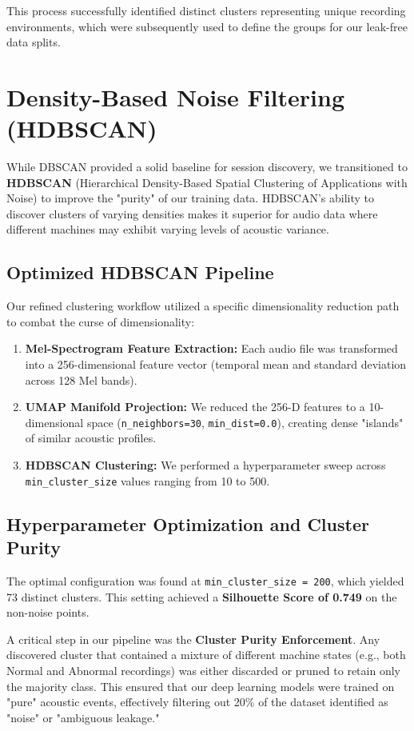 This process successfully identified distinct clusters representing unique recording environments, which were subsequently used to define the groups for our leak-free data splits.

\section{Density-Based Noise Filtering (HDBSCAN)}
While DBSCAN provided a solid baseline for session discovery, we transitioned to \textbf{HDBSCAN} (Hierarchical Density-Based Spatial Clustering of Applications with Noise) \cite{hdbscan2013} to improve the "purity" of our training data. HDBSCAN's ability to discover clusters of varying densities makes it superior for audio data where different machines may exhibit varying levels of acoustic variance.

\subsection{Optimized HDBSCAN Pipeline}
Our refined clustering workflow utilized a specific dimensionality reduction path to combat the curse of dimensionality:
\begin{enumerate}
    \item \textbf{Mel-Spectrogram Feature Extraction:} Each audio file was transformed into a 256-dimensional feature vector (temporal mean and standard deviation across 128 Mel bands).
    \item \textbf{UMAP Manifold Projection:} We reduced the 256-D features to a 10-dimensional space (\texttt{n\_neighbors=30}, \texttt{min\_dist=0.0}), creating dense "islands" of similar acoustic profiles.
    \item \textbf{HDBSCAN Clustering:} We performed a hyperparameter sweep across \texttt{min\_cluster\_size} values ranging from 10 to 500.
\end{enumerate}

\subsection{Hyperparameter Optimization and Cluster Purity}
The optimal configuration was found at \texttt{min\_cluster\_size = 200}, which yielded 73 distinct clusters. This setting achieved a \textbf{Silhouette Score of 0.749} on the non-noise points. 

A critical step in our pipeline was the \textbf{Cluster Purity Enforcement}. Any discovered cluster that contained a mixture of different machine states (e.g., both Normal and Abnormal recordings) was either discarded or pruned to retain only the majority class. This ensured that our deep learning models were trained on "pure" acoustic events, effectively filtering out 20\% of the dataset identified as "noise" or "ambiguous leakage."

